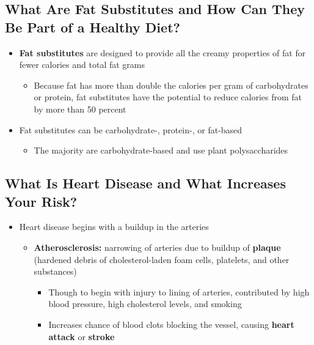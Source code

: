 \documentclass[12pt]{article}
\begin{document}
        \subsection{What Are Fat Substitutes and How Can They Be Part of a Healthy Diet?}
            \begin{itemize}
                \item \textbf{Fat substitutes} are designed to provide all the creamy properties of fat for fewer calories and total fat grams
                    \begin{itemize}
                        \item Because fat has more than double the calories per gram of carbohydrates or protein, fat substitutes have the potential to reduce calories from fat by more than 50 percent
                    \end{itemize}
                \item Fat substitutes can be carbohydrate-, protein-, or fat-based
                    \begin{itemize}
                        \item The majority are carbohydrate-based and use plant polysaccharides
                    \end{itemize}
            \end{itemize}

        \subsection{What Is Heart Disease and What Increases Your Risk?}
            \begin{itemize}
                \item Heart disease begins with a buildup in the arteries
                    \begin{itemize}
                        \item \textbf{Atherosclerosis:} narrowing of arteries due to buildup of \textbf{plaque} (hardened debris of cholesterol-laden foam cells, platelets, and other substances)
                            \begin{itemize}
                                \item Though to begin with injury to lining of arteries, contributed by high blood pressure, high cholesterol levels, and smoking
                                \item Increases chance of blood clots blocking the vessel, causing \textbf{heart attack} or \textbf{stroke}
                            \end{itemize}
                    \end{itemize}
            \end{itemize}
\end{document}
